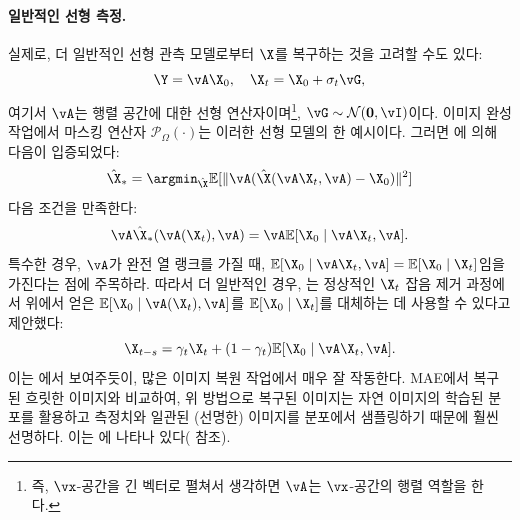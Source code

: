 \documentclass[../../book-main_ko.tex]{subfiles}
\begin{document}
\paragraph{일반적인 선형 측정.}
실제로, 더 일반적인 선형 관측 모델로부터 $\X$를 복구하는 것을 고려할 수도 있다:
\begin{equation}
    \Y = \vA\X_0,  \quad \X_t = \X_0 + \sigma_t \vG,  
\end{equation}
여기서 $\vA$는 행렬 공간에 대한 선형 연산자이며\footnote{즉, $\vx$-공간을 긴 벡터로 펼쳐서 생각하면 $\vA$는 $\vx$-공간의 행렬 역할을 한다.}, $\vG \sim \mathcal{N}(\boldsymbol{0}, \vI)$이다. 이미지 완성 작업에서 마스킹 연산자 $\mathcal{P}_{\Omega}(\cdot)$는 이러한 선형 모델의 한 예시이다. 그러면 \cite{daras2023ambient}에 의해 다음이 입증되었다:
\begin{equation}
    \hat{\X}_* = \argmin_{\hat{\X}} \mathbb{E}[\|\vA(\hat{\X}(\vA\X_t, \vA) - \X_0)\|^2]
\end{equation}
다음 조건을 만족한다:
\begin{equation}
    \vA \hat{\X}_*(\vA(\X_t), \vA) = \vA \mathbb{E}[\X_0 \mid \vA \X_t, \vA].
\end{equation} 특수한 경우, $\vA$가 완전 열 랭크를 가질 때, $ \mathbb{E}[\X_0 \mid \vA\X_t, \vA] = \mathbb{E}[\X_0 \mid \X_t]$임을 가진다는 점에 주목하라. 따라서 더 일반적인 경우, \cite{daras2023ambient}는 정상적인 $\X_t$ 잡음 제거 과정에서 위에서 얻은 $\mathbb{E}[\X_0 \mid \vA(\X_t), \vA]$를 $\mathbb{E}[\X_0 \mid \X_t]$를 대체하는 데 사용할 수 있다고 제안했다:
\begin{equation}
    \X_{t-s} = \gamma_t \X_t + (1-\gamma_t) \mathbb{E}[\X_0 \mid \vA\X_t, \vA].
\end{equation}
이는 \cite{daras2023ambient}에서 보여주듯이, 많은 이미지 복원 작업에서 매우 잘 작동한다. MAE에서 복구된 흐릿한 이미지와 비교하여, 위 방법으로 복구된 이미지는 자연 이미지의 학습된 분포를 활용하고 측정치와 일관된 (선명한) 이미지를 분포에서 샘플링하기 때문에 훨씬 선명하다. 이는 에 나타나 있다( 참조).
\end{document}
